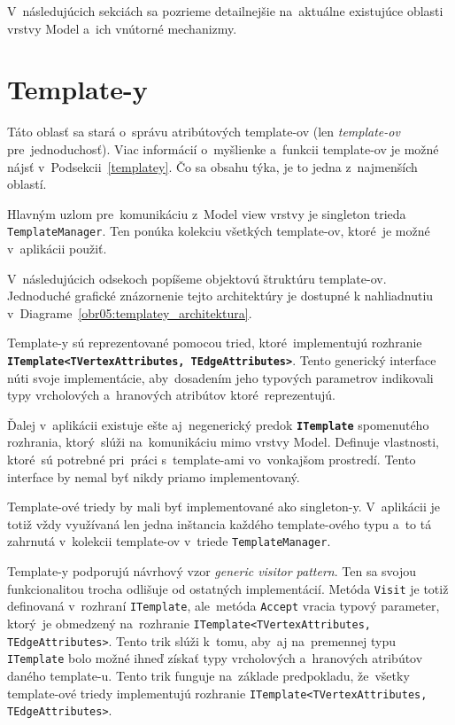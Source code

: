 V~následujúcich sekciách sa pozrieme detailnejšie na~aktuálne existujúce oblasti vrstvy Model a~ich vnútorné mechanizmy.

\section{Template-y}

Táto oblasť sa stará o~správu atribútových template-ov (len \textit{template-ov} pre~jednoduchosť). Viac informácií o~myšlienke a~funkcii template-ov je možné nájsť v~Podsekcii~\ref{templatey}. Čo sa obsahu týka, je to jedna z~najmenších oblastí.  

Hlavným uzlom pre~komunikáciu z~Model view vrstvy je singleton trieda \texttt{TemplateManager}. Ten ponúka kolekciu všetkých template-ov, ktoré~je možné v~aplikácii použiť. 

V~následujúcich odsekoch popíšeme objektovú štruktúru template-ov. Jednoduché grafické znázornenie tejto architektúry je dostupné k nahliadnutiu v~Diagrame~\ref{obr05:templatey_architektura}.   

\bigskip

Template-y sú reprezentované pomocou tried, ktoré~implementujú rozhranie \textbf{\texttt{ITemplate<TVertexAttributes, TEdgeAttributes>}}. Tento generický interface núti svoje implementácie, aby~dosadením jeho typových parametrov indikovali typy vrcholových a~hranových atribútov ktoré~reprezentujú. 

Ďalej v~aplikácii existuje ešte aj~negenerický predok \textbf{\texttt{ITemplate}} spomenutého rozhrania, ktorý~slúži na~komunikáciu mimo vrstvy Model. Definuje vlastnosti, ktoré~sú potrebné pri~práci s~template-ami vo~vonkajšom prostredí. Tento interface by nemal byť nikdy priamo implementovaný.

Template-ové triedy by mali byť implementované ako singleton-y. V~aplikácii je totiž vždy využívaná len jedna inštancia každého template-ového typu a~to tá zahrnutá v~kolekcii template-ov v~triede \texttt{TemplateManager}.

Template-y podporujú návrhový vzor \textit{generic visitor pattern}. Ten sa svojou funkcionalitou trocha odlišuje od ostatných implementácií. Metóda \texttt{Visit} je totiž definovaná v~rozhraní \texttt{ITemplate}, ale~metóda \texttt{Accept} vracia typový parameter, ktorý~je obmedzený na~rozhranie \texttt{ITemplate<TVertexAttributes, TEdgeAttributes>}. Tento trik slúži k~tomu, aby~aj na~premennej typu \texttt{ITemplate} bolo možné ihneď získať typy vrcholových a~hranových atribútov daného template-u. Tento trik funguje na~základe predpokladu, že~všetky template-ové triedy implementujú rozhranie \texttt{ITemplate<TVertexAttributes, TEdgeAttributes>}. 

